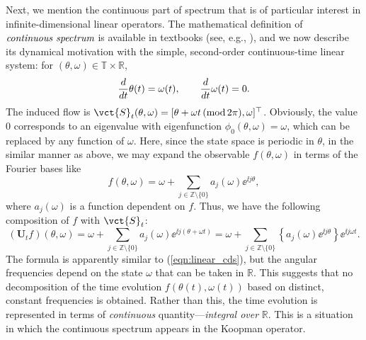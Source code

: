 \documentclass[a4paper,10pt]{article}
\def\bU{{\mathbf{U}}}
\def\bbR{{\mathbb{R}}}
\def\bbZ{{\mathbb{Z}}}
\begin{document}
%
Next, we mention the continuous part of spectrum that is of particular interest in infinite-dimensional linear operators.  
The mathematical definition of $\emph{continuous spectrum}$ is available in textbooks (see, e.g., \cite{Kato,Yoshida}), and we now describe its dynamical motivation with the simple, second-order continuous-time linear system: for $(\theta,\omega)\in\mathbb{T}\times\bbR$,
\[
\frac{d}{dt}\theta(t)=\omega(t),\makebox[2em]{}
\frac{d}{dt}\omega(t)=0.
\]
The induced flow is $\vct{S}_t(\theta,\omega)=[\theta+\omega t\,(\textrm{mod}\,2\pi),\omega]^\top$.  
Obviously, the value $0$ corresponds to an eigenvalue with eigenfunction $\phi_0(\theta,\omega)=\omega$, which can be replaced by any function of $\omega$. 
Here, since the state space is periodic in $\theta$, in the similar manner as above, we may expand the observable $f(\theta,\omega)$ in terms of the Fourier bases like
\[
f(\theta,\omega)=\omega+\sum_{j\in\bbZ\setminus\{0\}}a_j(\omega)\ee^{\ii j\theta},
\] 
where $a_j(\omega)$ is a function dependent on $f$.  
Thus, we have the following composition of $f$ with $\vct{S}_t$:
\[
(\bU_tf)(\theta,\omega)
=\omega+\sum_{j\in\bbZ\setminus\{0\}}a_j(\omega)\ee^{\ii j(\theta+\omega t)}
=\omega+\sum_{j\in\bbZ\setminus\{0\}}\left\{a_j(\omega)\ee^{\ii j\theta}\right\}\ee^{\ii j\omega t}.
\]
The formula is apparently similar to (\ref{eqn:linear_cds}), but the angular frequencies depend on the state $\omega$ that can be taken in $\bbR$.  
This suggests that no decomposition of the time evolution $f(\theta(t),\omega(t))$ based on distinct, constant frequencies is obtained.  
Rather than this, the time evolution is represented in terms of \emph{continuous} quantity---\emph{integral over} $\bbR$.  
This is a situation in which the continuous spectrum appears in the Koopman operator.  
\end{document}
